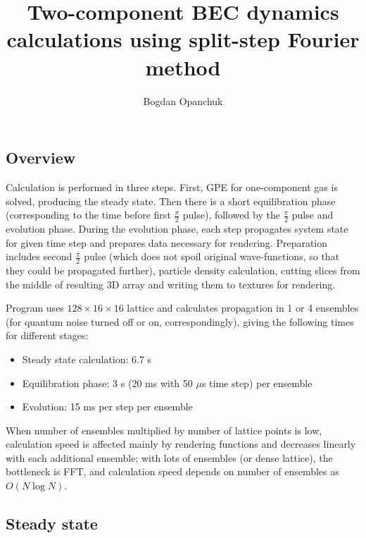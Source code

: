 \documentclass[12pt,notitlepage]{report}
\title{Two-component BEC dynamics calculations using split-step Fourier method}
\author{Bogdan Opanchuk}
\begin{document}
\maketitle
\subsection*{Overview}

Calculation is performed in three steps. First, GPE for one-component gas is solved, producing the steady state. Then there is a short equilibration phase (corresponding to the time before first $\frac{\pi}{2}$ pulse), followed by the $\frac{\pi}{2}$ pulse and evolution phase. During the evolution phase, each step propagates system state for given time step and prepares data necessary for rendering. Preparation includes second $\frac{\pi}{2}$ pulse (which does not spoil original wave-functions, so that they could be propagated further), particle density calculation, cutting slices from the middle of resulting 3D array and writing them to textures for rendering.

Program uses $128\times16\times16$ lattice and calculates propagation in 1 or 4 ensembles (for quantum noise turned off or on, correspondingly), giving the following times for different stages:

\begin{itemize}
\item Steady state calculation: 6.7 s
\item Equilibration phase: 3 s (20 ms with 50 $\mu$s time step) per ensemble
\item Evolution: 15 ms per step per ensemble 
\end{itemize}

When number of ensembles multiplied by number of lattice points is low, calculation speed is affected mainly by rendering functions and decreases linearly with each additional ensemble; with lots of ensembles (or dense lattice), the bottleneck is FFT, and calculation speed depends on number of ensembles as $O(N\log{N})$.

\subsection*{Steady state}
\end{document}
